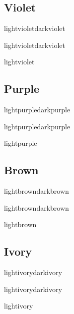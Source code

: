 \documentclass[10pt,twoside,twocolumn]{article}
\begin{document}
\subsection{Violet}
\begin{quotebox}{lightviolet}{darkviolet}
    \lipsum[1][1-4]
\end{quotebox}
\begin{paperbox}{}{lightviolet}{darkviolet}
    \lipsum[1][5-9]
\end{paperbox}
\begin{commentbox}{}{lightviolet}
    \lipsum[2][1-5]
\end{commentbox}

\subsection{Purple}
\begin{quotebox}{lightpurple}{darkpurple}
    \lipsum[1][1-4]
\end{quotebox}
\begin{paperbox}{}{lightpurple}{darkpurple}
    \lipsum[1][5-9]
\end{paperbox}
\begin{commentbox}{}{lightpurple}
    \lipsum[2][1-5]
\end{commentbox}

\newpage

\subsection{Brown}
\begin{quotebox}{lightbrown}{darkbrown}
    \lipsum[1][1-4]
\end{quotebox}
\begin{paperbox}{}{lightbrown}{darkbrown}
    \lipsum[1][5-9]
\end{paperbox}
\begin{commentbox}{}{lightbrown}
    \lipsum[2][1-5]
\end{commentbox}

\subsection{Ivory}
\begin{quotebox}{lightivory}{darkivory}
    \lipsum[1][1-4]
\end{quotebox}
\begin{paperbox}{}{lightivory}{darkivory}
    \lipsum[1][5-9]
\end{paperbox}
\begin{commentbox}{}{lightivory}
    \lipsum[2][1-5]
\end{commentbox}

\end{document}
